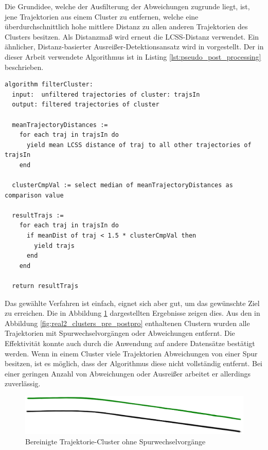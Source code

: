 Die Grundidee, welche der Ausfilterung der Abweichungen zugrunde liegt, ist, jene Trajektorien
aus einem Cluster zu entfernen, welche eine überdurchschnittlich hohe mittlere Distanz zu allen anderen
Trajektorien des Clusters besitzen. Als Distanzmaß wird erneut die LCSS-Distanz verwendet.
Ein ähnlicher, Distanz-basierter Ausreißer-Detektionsansatz wird in \cite[]{Mirge2017} vorgestellt.
Der in dieser Arbeit verwendete Algorithmus ist in Listing \ref{lst:pseudo_post_processing} beschrieben.

\begin{lstlisting}[caption=Pseudocode Cluster Post-Processing, language=Pseudo, label=lst:pseudo_post_processing]
algorithm filterCluster:
  input:  unfiltered trajectories of cluster: trajsIn
  output: filtered trajectories of cluster

  meanTrajectoryDistances :=
    for each traj in trajsIn do
      yield mean LCSS distance of traj to all other trajectories of trajsIn
    end

  clusterCmpVal := select median of meanTrajectoryDistances as comparison value

  resultTrajs :=
    for each traj in trajsIn do
      if meanDist of traj < 1.5 * clusterCmpVal then
        yield trajs
      end
    end

  return resultTrajs
\end{lstlisting}

Das gewählte Verfahren ist einfach, eignet sich aber gut, um das gewünschte Ziel zu erreichen.
Die in Abbildung \ref{fig:real2_clusters_post_postpro} dargestellten Ergebnisse zeigen dies.
Aus den in Abbildung \ref{fig:real2_clusters_pre_postpro} enthaltenen Clustern wurden alle Trajektorien
mit Spurwechselvorgängen oder Abweichungen entfernt. Die Effektivität konnte auch durch die Anwendung
auf andere Datensätze bestätigt werden.
Wenn in einem Cluster viele Trajektorien Abweichungen von einer Spur besitzen, ist es möglich, dass der Algorithmus
diese nicht vollständig entfernt. Bei einer geringen Anzahl von Abweichungen oder Ausreißer arbeitet
er allerdings zuverlässig.

\begin{figure}[H]
    \centering
    \includegraphics[width=0.8\linewidth]{resources/img/umsetzung/U2/Clusters_Post_Postprocessing}
    \caption{Bereinigte Trajektorie-Cluster ohne Spurwechselvorgänge}
    \label{fig:real2_clusters_post_postpro}
\end{figure}

